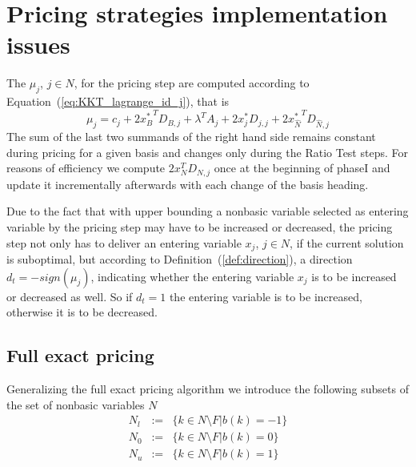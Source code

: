 \documentclass[a4paper]{article}
\begin{document}
\section{Pricing strategies implementation issues}
The $\mu_{j}$, $j \in N$, for the pricing step are computed according to
Equation~(\ref{eq:KKT_lagrange_id_j}),
that is
\begin{equation}
\mu_{j}=
  c_{j} + 2{x_{B}^{*}}^{T}D_{B,j}
  +\lambda^{T} A_{j}
  + 2x_{j}^{*}D_{j,j}
  + 2{x_{\hat{N}}^{*}}^{T}D_{\hat{N},j}
\end{equation}
The sum of the last two summands of the right hand side remains constant
during pricing for a given basis and changes only during the Ratio Test steps.
For reasons of efficiency we compute $2x_{N}^{T}D_{N,j}$ once at the
beginning of phaseI and update it incrementally afterwards with each change
of the basis heading.

Due to the fact that with upper bounding a nonbasic variable selected 
as entering variable by the 
pricing step may have to be increased or decreased, 
the pricing step not
only has to deliver an entering variable $x_{j}$, $j \in N$, if the current
solution is suboptimal, but according to Definition~(\ref{def:direction}), a
direction $d_{t}=-sign(\mu_{j})$, indicating whether the entering variable
$x_{j}$ is to be increased or decreased as well. So if $d_{t}=1$ the entering
variable is to be increased, otherwise it is to be decreased.

\subsection{Full exact pricing}
Generalizing the full exact pricing algorithm we introduce the following subsets of the set of nonbasic variables $N$
\begin{eqnarray}
N_{l}&:=&\{k \in N \setminus F\left|\right. b\left(k\right)=-1\} \\
N_{0}&:=&\{k \in N \setminus F\left|\right. b\left(k\right)=0\} \\
N_{u}&:=&\{k \in N \setminus F\left|\right. b\left(k\right)=1\}
\end{eqnarray}
\end{document}
